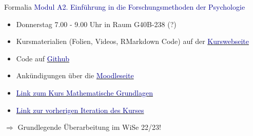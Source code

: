 \documentclass[
  8pt,
  ignorenonframetext,
]{beamer}
\providecommand{\tightlist}{%
  \setlength{\itemsep}{0pt}\setlength{\parskip}{0pt}}
\begin{document}
\begin{frame}{Formalia}
\protect\hypertarget{formalia-3}{}
\textcolor{darkblue}{Modul A2. Einführung in die Forschungsmethoden der Psychologie}

\begin{itemize}
\tightlist
\item
  Donnerstag 7.00 - 9.00 Uhr in Raum G40B-238 (?)
\item
  Kursmaterialien (Folien, Videos, RMarkdown Code) auf der
  \href{https://bit.ly/3T6BcoQ}{\textcolor{darkblue}{Kurswebseite}}
\item
  Code auf
  \href{https://github.com/dirk-ostwald/psychologische-forschungsmethoden-23}{\textcolor{darkblue}{Github}}
\item
  Ankündigungen über die
  \href{https://elearning.ovgu.de/course/view.php?id=13818}{\textcolor{darkblue}{Moodleseite}}
\item
  \href{https://bit.ly/3SNh3nR}{\textcolor{darkblue}{Link zum Kurs Mathematische Grundlagen}}
\item
  \href{https://bit.ly/3MmsfFK}{\textcolor{darkblue}{Link zur vorherigen Iteration des Kurses}}
\end{itemize}

\flushright

\(\Rightarrow\) Grundlegende Überarbeitung im WiSe 22/23!
\end{frame}
\end{document}
